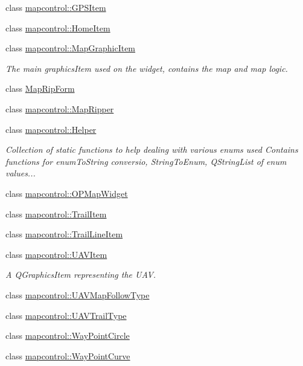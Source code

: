 \begin{DoxyCompactItemize}
class \hyperlink{classmapcontrol_1_1_g_p_s_item}{mapcontrol\-::\-G\-P\-S\-Item}
\item 
class \hyperlink{classmapcontrol_1_1_home_item}{mapcontrol\-::\-Home\-Item}
\item 
class \hyperlink{classmapcontrol_1_1_map_graphic_item}{mapcontrol\-::\-Map\-Graphic\-Item}
\begin{DoxyCompactList}\small\item\em \-The main graphics\-Item used on the widget, contains the map and map logic. \end{DoxyCompactList}\item 
class \hyperlink{class_map_rip_form}{\-Map\-Rip\-Form}
\item 
class \hyperlink{classmapcontrol_1_1_map_ripper}{mapcontrol\-::\-Map\-Ripper}
\item 
class \hyperlink{classmapcontrol_1_1_helper}{mapcontrol\-::\-Helper}
\begin{DoxyCompactList}\small\item\em \-Collection of static functions to help dealing with various enums used \-Contains functions for enum\-To\-String conversio, \-String\-To\-Enum, \-Q\-String\-List of enum values... \end{DoxyCompactList}\item 
class \hyperlink{classmapcontrol_1_1_o_p_map_widget}{mapcontrol\-::\-O\-P\-Map\-Widget}
\item 
class \hyperlink{classmapcontrol_1_1_trail_item}{mapcontrol\-::\-Trail\-Item}
\item 
class \hyperlink{classmapcontrol_1_1_trail_line_item}{mapcontrol\-::\-Trail\-Line\-Item}
\item 
class \hyperlink{classmapcontrol_1_1_u_a_v_item}{mapcontrol\-::\-U\-A\-V\-Item}
\begin{DoxyCompactList}\small\item\em \-A \-Q\-Graphics\-Item representing the \-U\-A\-V. \end{DoxyCompactList}\item 
class \hyperlink{classmapcontrol_1_1_u_a_v_map_follow_type}{mapcontrol\-::\-U\-A\-V\-Map\-Follow\-Type}
\item 
class \hyperlink{classmapcontrol_1_1_u_a_v_trail_type}{mapcontrol\-::\-U\-A\-V\-Trail\-Type}
\item 
class \hyperlink{classmapcontrol_1_1_way_point_circle}{mapcontrol\-::\-Way\-Point\-Circle}
\item 
class \hyperlink{classmapcontrol_1_1_way_point_curve}{mapcontrol\-::\-Way\-Point\-Curve}

\end{DoxyCompactItemize}
